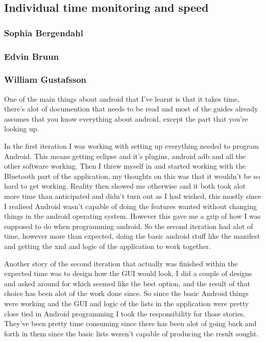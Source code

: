 \subsection{Individual time monitoring and speed}
\subsubsection{Sophia Bergendahl}
\subsubsection{Edvin Bruun}
\subsubsection{William Gustafsson}
One of the main things about android that I've learnt is that it takes time, 
there's alot of documention that needs to be read and most of the guides already assumes that you know everything about android, except the part that you're looking up.

In the first iteration I was working with setting up everything needed to program Android. This means getting eclipse and it's plugins, android adb and all the other software working. 
Then I threw myself in and started working with the Bluetooth part of the application, my thoughts on this was that it wouldn't be so hard to get working. 
Reality then showed me otherwise and it both took alot more time than anticipated and didn't turn out as I had wished,
this mostly since I realised Android wasn't capable of doing the features wanted without changing things in the android operating system. However this gave me a grip of how I was supposed to
do when programming android. So the second iteration had alot of time, however more than expected, doing the basic android stuff like the manifest and getting the xml and logic of the application to work together.

Another story of the second iteration that actually was finished within the expected time was to design how the GUI would look, I did a couple of designs and asked around for which seemed like the best option, and
the result of that choice has been alot of the work done since. So since the basic Android things were working and the GUI and logic of the lists in 
the application were pretty close tied in Android programming I took the responsibility for those stories. They've been pretty time consuming since there has been alot of going back and forth in them since the 
basic lists weren't capable of producing the result sought.

